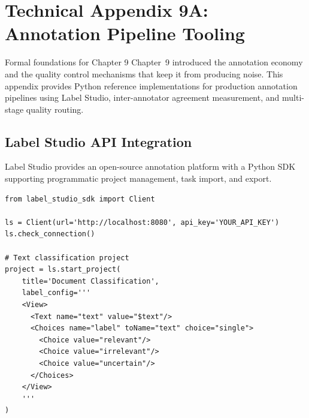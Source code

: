 
\chapter*{Technical Appendix 9A: Annotation Pipeline Tooling}

\begin{chapterquote}{Formal foundations for Chapter 9}
Chapter~9 introduced the annotation economy and the quality control mechanisms that keep it from producing noise. This appendix provides Python reference implementations for production annotation pipelines using Label Studio, inter-annotator agreement measurement, and multi-stage quality routing.
\end{chapterquote}

\apxnumon
\section{Label Studio API Integration}

Label Studio provides an open-source annotation platform with a Python SDK supporting programmatic project management, task import, and export.

\begin{lstlisting}[style=python, caption={Label Studio connection and project creation}]
from label_studio_sdk import Client

ls = Client(url='http://localhost:8080', api_key='YOUR_API_KEY')
ls.check_connection()

# Text classification project
project = ls.start_project(
    title='Document Classification',
    label_config='''
    <View>
      <Text name="text" value="$text"/>
      <Choices name="label" toName="text" choice="single">
        <Choice value="relevant"/>
        <Choice value="irrelevant"/>
        <Choice value="uncertain"/>
      </Choices>
    </View>
    '''
)
\end{lstlisting}

